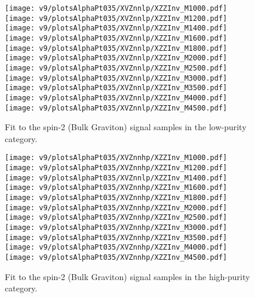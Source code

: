 \begin{figure}[!htb]
  \centering
    \texttt{[image: v9/plotsAlphaPt035/XVZnnlp/XZZInv\_M1000.pdf]}
    \texttt{[image: v9/plotsAlphaPt035/XVZnnlp/XZZInv\_M1200.pdf]}
    \texttt{[image: v9/plotsAlphaPt035/XVZnnlp/XZZInv\_M1400.pdf]}
     \\
    \texttt{[image: v9/plotsAlphaPt035/XVZnnlp/XZZInv\_M1600.pdf]}
    \texttt{[image: v9/plotsAlphaPt035/XVZnnlp/XZZInv\_M1800.pdf]}
    \texttt{[image: v9/plotsAlphaPt035/XVZnnlp/XZZInv\_M2000.pdf]}
     \\
    \texttt{[image: v9/plotsAlphaPt035/XVZnnlp/XZZInv\_M2500.pdf]}
    \texttt{[image: v9/plotsAlphaPt035/XVZnnlp/XZZInv\_M3000.pdf]}
    \texttt{[image: v9/plotsAlphaPt035/XVZnnlp/XZZInv\_M3500.pdf]}
     \\
    \texttt{[image: v9/plotsAlphaPt035/XVZnnlp/XZZInv\_M4000.pdf]}
    \texttt{[image: v9/plotsAlphaPt035/XVZnnlp/XZZInv\_M4500.pdf]}
  \caption{Fit to the spin-2 (Bulk Graviton) signal samples in the low-purity category.}
  \label{fig:XVZnnlp_Signal}
\end{figure}


\begin{figure}[!htb]
  \centering
    \texttt{[image: v9/plotsAlphaPt035/XVZnnhp/XZZInv\_M1000.pdf]}
    \texttt{[image: v9/plotsAlphaPt035/XVZnnhp/XZZInv\_M1200.pdf]}
    \texttt{[image: v9/plotsAlphaPt035/XVZnnlp/XZZInv\_M1400.pdf]}
     \\
    \texttt{[image: v9/plotsAlphaPt035/XVZnnhp/XZZInv\_M1600.pdf]}
    \texttt{[image: v9/plotsAlphaPt035/XVZnnhp/XZZInv\_M1800.pdf]}
    \texttt{[image: v9/plotsAlphaPt035/XVZnnhp/XZZInv\_M2000.pdf]}
     \\
    \texttt{[image: v9/plotsAlphaPt035/XVZnnhp/XZZInv\_M2500.pdf]}
    \texttt{[image: v9/plotsAlphaPt035/XVZnnhp/XZZInv\_M3000.pdf]}
    \texttt{[image: v9/plotsAlphaPt035/XVZnnhp/XZZInv\_M3500.pdf]}
     \\
    \texttt{[image: v9/plotsAlphaPt035/XVZnnhp/XZZInv\_M4000.pdf]}
    \texttt{[image: v9/plotsAlphaPt035/XVZnnhp/XZZInv\_M4500.pdf]}
  \caption{Fit to the spin-2 (Bulk Graviton) signal samples in the high-purity category.}
  \label{fig:XVZnnhp_Signal}
\end{figure}

